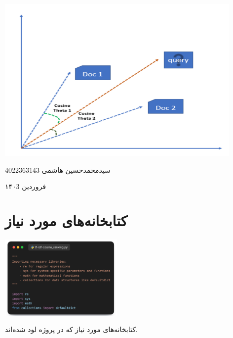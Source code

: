 \documentclass[12pt, dvipsnames, svgnames, x11names,]{article}
\begin{document}
	\begin{titlepage}
		\centering
		\vspace{1cm}
		{\Huge {\textbf{}}\par}
		\vspace{15mm}
		\vspace{16mm}
		\includegraphics[width=12cm]{images/00.png} \par
		\vfill \par	\vfill
		\vspace{16mm}
		{\normalsize	سیدمحمدحسین هاشمی  4022363143 \par}
		\vspace{1cm}
		{\large فروردین ۱۴۰3\par}
	\end{titlepage}
	\tableofcontents
	\newpage
	
	\section{کتابخانه‌های مورد نیاز}

		\begin{center}
			{\includegraphics[width=6cm]{images/01.png}}
		\end{center}

		{\normalsize کتابخانه‌های مورد نیاز که در پروژه لود شده‌اند.}
\end{document}

